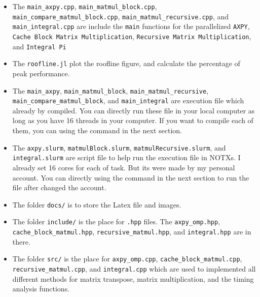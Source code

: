 \documentclass[11pt]{article}
\begin{document}
\begin{itemize}
    \item The \verb|main_axpy.cpp|, \verb|main_matmul_block.cpp|, \verb|main_compare_matmul_block.cpp|, \verb|main_matmul_recursive.cpp|, and \verb|main_integral.cpp| are include the \verb|main| functions for the parallelized \verb|AXPY|, \verb|Cache Block Matrix Multiplication|, \verb|Recursive Matrix Multiplication|, and \verb|Integral Pi|
    \item The \verb|roofline.jl| plot the roofline figure, and calculate the percentage of peak performance.
    \item The \verb|main_axpy|, \verb|main_matmul_block|, \verb|main_matmul_recursive|, \verb|main_compare_matmul_block|, and \verb|main_integral| are execution file which already by compiled. You can directly run these file in your local computer as long as you have 16 threads in your computer. If you want to compile each of them, you can using the command in the next section.
    \item The \verb|axpy.slurm|, \verb|matmulBlock.slurm|, \verb|matmulRecursive.slurm|, and \verb|integral.slurm| are script file to help run the execution file in NOTXs. I already set 16 cores for each of task. But its were made by my personal account. You can directly using the command in the next section to run the file after changed the account.
    \item The folder \texttt{docs/} is to store the Latex file and images.
    \item The folder \texttt{include/} is the place for \verb|.hpp| files. The \verb|axpy_omp.hpp|, \verb|cache_block_matmul.hpp|, \verb|recursive_matmul.hpp|, and \verb|integral.hpp| are in there.
    \item The folder \texttt{src/} is the place for \verb|axpy_omp.cpp|, \verb|cache_block_matmul.cpp|, \verb|recursive_matmul.cpp|, and \verb|integral.cpp|  which are used to implemented all different methods for matrix transpose, matrix multiplication, and the timing analysis functions.


\end{itemize}

\newpage
\end{document}
